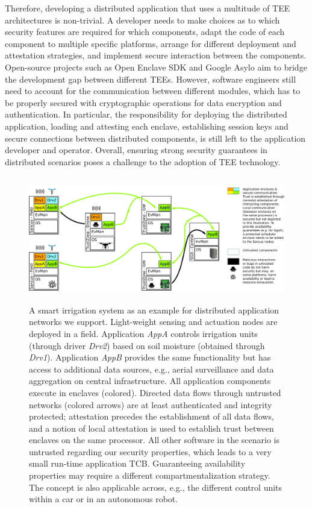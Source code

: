 \documentclass[sigconf]{acmart}
\begin{document}
Therefore, developing a distributed application that uses a multitude of
\ac{TEE} architectures is non-trivial. A developer needs to make choices
as to which security features are required for which components, adapt the
code of each component to multiple specific platforms, arrange for different
deployment and attestation strategies, and implement secure interaction
between the components. Open-source projects such as Open Enclave SDK and
Google Asylo aim to bridge the development gap between different \acp{TEE}.
However, software engineers still need to account for the communication
between different modules, which has to be properly secured with
cryptographic operations for data encryption and authentication.  In
particular, the responsibility for deploying the distributed application,
loading and attesting each enclave, establishing session keys and secure
connections between distributed components, is still left to the
application developer and operator. Overall, ensuring strong security guarantees in
distributed scenarios poses a challenge to  the adoption of \ac{TEE}
technology.
%
\begin{figure}[ht!]
%
  \includegraphics[height=55mm]{graphics/20210808-scenario.pdf}
%
  \caption{A smart irrigation system as an example for distributed
application networks we support. Light-weight sensing and actuation nodes
are deployed in a field. Application \emph{AppA} controls irrigation units
(through driver \emph{Drv2}) based on soil moisture (obtained through
\emph{Drv1}). Application \emph{AppB} provides the same functionality but
has access to additional data sources, e.g., aerial surveillance and data
aggregation on central infrastructure. All application components execute
in enclaves (colored).
Directed data flows through untrusted networks (colored arrows) are at
least  authenticated and integrity protected; attestation precedes the
establishment of all data flows, and a notion of local attestation is used
to establish trust between enclaves on the same processor. All other
software in the scenario is untrusted regarding our security properties,
which leads to a very small run-time application \ac{TCB}. Guaranteeing
availability properties may require a different compartmentalization
strategy. The concept is also applicable across, e.g., the different
control units within a car or in an autonomous robot.}
%
  \label{fig:scenario}
%
\end{figure}
\end{document}
